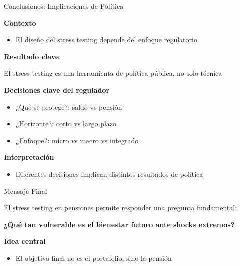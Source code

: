 \documentclass{beamer}
\begin{document}
\begin{frame}{Conclusiones: Implicaciones de Política}

\textbf{Contexto}
\begin{itemize}
\item El diseño del stress testing depende del enfoque regulatorio
\end{itemize}

\vspace{0.3cm}

\textbf{Resultado clave}
\begin{block}{}
El stress testing es una herramienta de política pública, no solo técnica
\end{block}

\vspace{0.3cm}

\textbf{Decisiones clave del regulador}
\begin{itemize}
\item ¿Qué se protege?: saldo vs pensión
\item ¿Horizonte?: corto vs largo plazo
\item ¿Enfoque?: micro vs macro vs integrado
\end{itemize}

\vspace{0.3cm}

\textbf{Interpretación}
\begin{itemize}
\item Diferentes decisiones implican distintos resultados de política
\end{itemize}

\end{frame}

\begin{frame}{Mensaje Final}

\begin{block}{}
El stress testing en pensiones permite responder una pregunta fundamental:
\end{block}

\vspace{0.5cm}

\centering
\Large
\textbf{¿Qué tan vulnerable es el bienestar futuro ante shocks extremos?}

\vspace{0.5cm}

\normalsize
\textbf{Idea central}
\begin{itemize}
\item El objetivo final no es el portafolio, sino la pensión
\end{itemize}

\end{frame}
\end{document}
